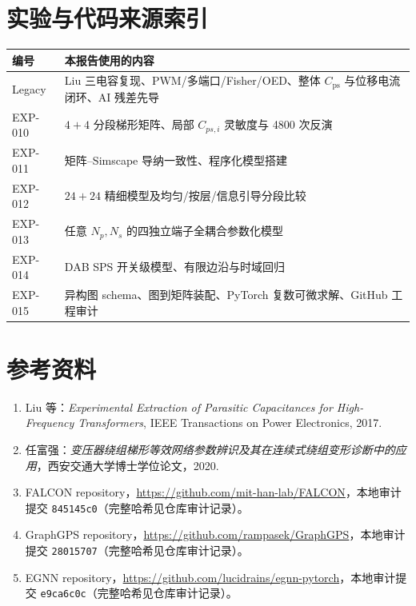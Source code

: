 \documentclass[UTF8,11pt,a4paper]{ctexart}
\newcommand{\Cps}{C_{\mathrm{ps}}}
\begin{document}
\section*{实验与代码来源索引}
\small
\setlength{\tabcolsep}{4pt}
\noindent
\begin{tabularx}{\textwidth}{p{1.8cm}X}
\toprule
编号 & 本报告使用的内容\\
\midrule
Legacy & Liu 三电容复现、PWM/多端口/Fisher/OED、整体 $\Cps$ 与位移电流闭环、AI 残差先导\\
EXP-010 & $4+4$ 分段梯形矩阵、局部 $C_{ps,i}$ 灵敏度与 4800 次反演\\
EXP-011 & 矩阵--Simscape 导纳一致性、程序化模型搭建\\
EXP-012 & $24+24$ 精细模型及均匀/按层/信息引导分段比较\\
EXP-013 & 任意 $N_p,N_s$ 的四独立端子全耦合参数化模型\\
EXP-014 & DAB SPS 开关级模型、有限边沿与时域回归\\
EXP-015 & 异构图 schema、图到矩阵装配、PyTorch 复数可微求解、GitHub 工程审计\\
\bottomrule
\end{tabularx}

\section*{参考资料}
\begin{enumerate}
\item Liu 等：\emph{Experimental Extraction of Parasitic Capacitances for High-Frequency Transformers}, IEEE Transactions on Power Electronics, 2017.
\item 任富强：\emph{变压器绕组梯形等效网络参数辨识及其在连续式绕组变形诊断中的应用}，西安交通大学博士学位论文，2020.
\item FALCON repository，\url{https://github.com/mit-han-lab/FALCON}，本地审计提交 \texttt{845145c0}（完整哈希见仓库审计记录）。
\item GraphGPS repository，\url{https://github.com/rampasek/GraphGPS}，本地审计提交 \texttt{28015707}（完整哈希见仓库审计记录）。
\item EGNN repository，\url{https://github.com/lucidrains/egnn-pytorch}，本地审计提交 \texttt{e9ca6c0c}（完整哈希见仓库审计记录）。
\end{enumerate}
\end{document}
